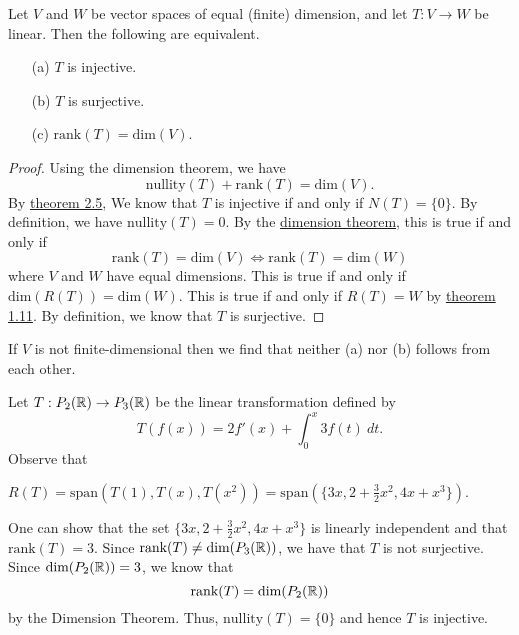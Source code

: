\begin{theorem}
    Let \( V  \) and \( W  \) be vector spaces of equal (finite) dimension, and let \( T : V \to W  \) be linear. Then the following are equivalent.
    \begin{enumerate}
        \item[(a)] \( T  \) is injective.
        \item[(b)] \( T \) is surjective.
        \item[(c)] \( \text{rank}(T) = \text{dim}(V) \).
    \end{enumerate}
\end{theorem}

\begin{proof}
    Using the dimension theorem, we have
    \[ \text{nullity}(T) + \text{rank}(T) = \text{dim}(V).  \]
    By {\hyperref[Theorem 2.5]{theorem 2.5}}, We know that \( T  \) is injective if and only if \( N(T) = \{ 0  \}  \). By definition, we have  \( \text{nullity}(T) = 0  \). By the {\hyperref[Dimension Theorem]{dimension theorem}}, this is true if and only if 
    \[ \text{rank}(T) = \text{dim}(V) \iff \text{rank}(T) = \text{dim}(W) \]
    where \( V  \) and \( W  \) have equal dimensions.
    This is true if and only if \( \text{dim}(R(T)) = \text{dim}(W ) \). This is true if and only if \( R(T) = W  \) by {\hyperref[Theorem 1.11]{theorem 1.11}}. By definition, we know that \( T \) is surjective. 
\end{proof}

\begin{remark}
    If \( V  \) is not finite-dimensional then we find that neither (a) nor (b) follows from each other.
\end{remark}

\begin{eg}
    Let \( T: P_{2}(\mathbb{R}) \to P_{3}(\mathbb{R})  \) be the linear transformation defined by 
    \[  T(f(x)) = 2 f'(x) + \int_{ 0 }^{ x }  3f(t)  \ dt. \]
    Observe that
    \begin{center}
        \( R(T) = \text{span}(T(1), T(x), T(x^{2})) = \text{span}(\{ 3x, 2 + \frac{ 3 }{ 2 } x^{2} , 4x + x^{3} \} ). \)
    \end{center}
    One can show that the set \( \{ 3x, 2 + \frac{ 3 }{ 2 } x^{2} , 4x + x^{3} \}  \) is linearly independent and that \( \text{rank}(T) = 3  \). Since \( \text{rank}(T) \neq \text{dim}(P_{3}(\mathbb{R})) \), we have that \( T  \) is not surjective. Since \( \text{dim}(P_{2}(\mathbb{R})) = 3  \), we know that
    \[   \text{rank}(T) = \text{dim}(P_{2}(\mathbb{R})) \]
    by the Dimension Theorem. Thus, \( \text{nullity}(T) = \{ 0 \}  \) and hence \( T  \) is injective.
\end{eg}

